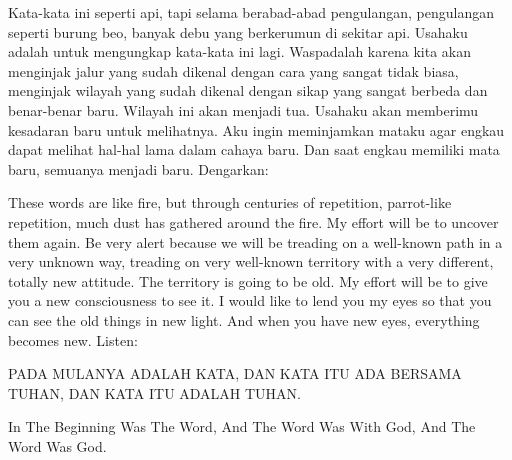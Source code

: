 \bahasa
Kata-kata ini seperti api, tapi selama berabad-abad pengulangan, pengulangan seperti burung beo, banyak debu yang berkerumun di sekitar api. Usahaku adalah untuk mengungkap kata-kata ini lagi. Waspadalah karena kita akan menginjak jalur yang sudah dikenal dengan cara yang sangat tidak biasa, menginjak wilayah yang sudah dikenal dengan sikap yang sangat berbeda dan benar-benar baru. Wilayah ini akan menjadi tua. Usahaku akan memberimu kesadaran baru untuk melihatnya. Aku ingin meminjamkan mataku agar engkau dapat melihat hal-hal lama dalam cahaya baru. Dan saat engkau memiliki mata baru, semuanya menjadi baru. Dengarkan:

\english
These words are like fire, but through centuries of repetition, parrot-like repetition, much dust has gathered around the fire. My effort will be to uncover them again. Be very alert because we will be treading on a well-known path in a very unknown way, treading on very well-known territory with a very different, totally new attitude. The territory is going to be old. My effort will be to give you a new consciousness to see it. I would like to lend you my eyes so that you can see the old things in new light. And when you have new eyes, everything becomes new. Listen:

\bahasa
PADA MULANYA ADALAH KATA, DAN KATA ITU ADA BERSAMA TUHAN, DAN KATA ITU ADALAH TUHAN.

\english
In The Beginning Was The Word, And The Word Was With God, And The Word Was God.

